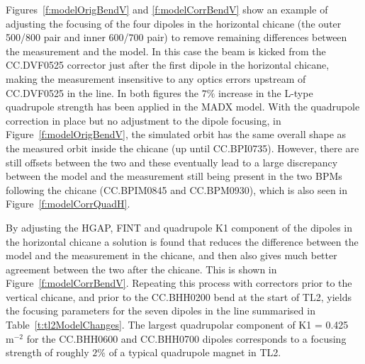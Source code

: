 Figures~\ref{f:modelOrigBendV} and \ref{f:modelCorrBendV} show an example of adjusting the focusing of the four dipoles in the horizontal chicane (the outer 500/800 pair and inner 600/700 pair) to remove remaining differences between the measurement and the model. In this case the beam is kicked from the CC.DVF0525 corrector just after the first dipole in the horizontal chicane, making the measurement insensitive to any optics errors upstream of CC.DVF0525 in the line. In both figures the \(7\%\) increase in the L-type quadrupole strength has been applied in the MADX model. With the quadrupole correction in place but no adjustment to the dipole focusing, in Figure~\ref{f:modelOrigBendV}, the simulated orbit has the same overall shape as the measured orbit inside the chicane (up until CC.BPI0735). However, there are still offsets between the two and these eventually lead to a large discrepancy between the model and the measurement still being present in the two BPMs following the chicane (CC.BPIM0845 and CC.BPM0930), which is also seen in Figure~\ref{f:modelCorrQuadH}. 

By adjusting the HGAP, FINT and quadrupole K1 component of the dipoles in the horizontal chicane a solution is found that reduces the difference between the model and the measurement in the chicane, and then also gives much better agreement between the two after the chicane. This is shown in Figure~\ref{f:modelCorrBendV}. Repeating this process with correctors prior to the vertical chicane, and prior to the CC.BHH0200 bend at the start of TL2, yields the focusing parameters for the seven dipoles in the line summarised in Table~\ref{t:tl2ModelChanges}. The largest quadrupolar component of K1 = 0.425~\(\mathrm{m^{-2}}\) for the CC.BHH0600 and CC.BHH0700 dipoles corresponds to a focusing strength of roughly \(2\%\) of a typical quadrupole magnet in TL2.

